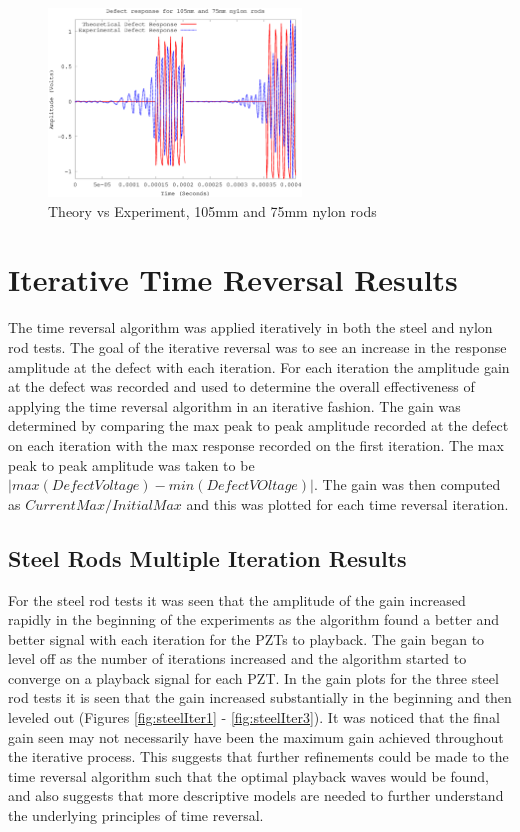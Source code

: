  \begin{figure}[ht!]
 \centering
 \includegraphics[width=0.6\textwidth]{eps_pics/nylon-3-4_Iter_th_exp.eps}
 \caption{Theory vs Experiment, 105mm and 75mm nylon rods
 	 \label{fig:nylonThExp3}} 
 \end{figure}
 
 
 \section{Iterative Time Reversal Results}
 The time reversal algorithm was applied iteratively in both the steel and nylon rod tests. The goal of the iterative reversal was to see an increase in the response amplitude at the defect with each iteration. For each iteration the amplitude gain at the defect was recorded and used to determine the overall effectiveness of applying the time  reversal algorithm in an iterative fashion. The gain was determined by comparing the max peak to peak amplitude recorded at the defect on each iteration with the max response recorded on the first iteration. The max peak to peak amplitude was taken to be $|max(DefectVoltage) - min(DefectVOltage)|$. The gain was then computed as $CurrentMax / InitialMax$ and this was plotted for each time reversal iteration. 
 
 \subsection{Steel Rods Multiple Iteration Results}
 For the steel rod tests it was seen that the amplitude of the gain increased rapidly in the beginning of the experiments as the algorithm found a better and better signal with each iteration for the PZTs to playback. The gain began to level off as the number of iterations increased and the algorithm started to converge on a playback signal for each PZT. In the gain plots for the three steel rod tests it is seen that the gain increased substantially in the beginning and then leveled out (Figures \ref{fig:steelIter1} - \ref{fig:steelIter3}). It was noticed that the final gain seen may not necessarily have been the maximum gain achieved throughout the iterative process. This suggests that further refinements could be made to the time reversal algorithm such that the optimal playback waves would be found, and also suggests that more descriptive models are needed to further understand the underlying principles of time reversal.

